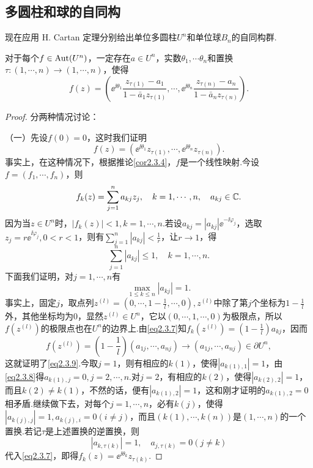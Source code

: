 \subsection{多圆柱和球的自同构}
现在应用 H. Cartan 定理分别给出单位多圆柱$U^n$和单位球$B_n$的自同构群.
\begin{theorem}\label{thm2.3.7}
	对于每个$f\in\operatorname{Aut}(U^n)$，一定存在$a\in U^n$，实数$\theta_1,\cdots\theta_n$和置换$\tau\colon(1,\cdots,n)\to(1,\cdots,n)$，使得
	\[f(z)=\left(\ee^{\ii\theta_1}\frac{z_{\tau(1)}-a_1}{1-\bar{a}_1 z_{\tau(1)}},\cdots,\ee^{\ii\theta_n}\frac{z_{\tau(n)}-a_n}{1-\bar{a}_n z_{\tau(n)}}\right).\]
\end{theorem}
\begin{proof}
	分两种情况讨论：
	
	（一）\hypertarget{2.3.7}{}\quad 先设$f(0)=0$，这时我们证明
	\[f(z)=(\ee^{\ii\theta_1}z_{\tau(1)},\cdots,\ee^{\ii\theta_n}z_{\tau(n)}).\]
	事实上，在这种情况下，根据推论\ref{cor2.3.4}，$f$是一个线性映射.今设$f=(f_1,\cdots,f_n)$，则
	\begin{equation}\label{eq2.3.7}
		f_k(z)=\sum_{j=1}^n a_{kj}z_j,\quad k=1,\cdots,n,\quad a_{kj}\in\mathbb C.
	\end{equation}
因为当$z\in U^n$时，$|f_k(z)|<1,k=1,\cdots,n$.若设$a_{kj}=|a_{kj}|\ee^{-\ii\varphi_j}$，选取$z_j=r\ee^{\ii\varphi_j},0<r<1$，则有$\sum\limits_{j=1}^n |a_{kj}|<\frac1r$，让$r\to 1$，得
\begin{equation}\label{eq2.3.8}
	\sum_{j=1}^{n}|a_{kj}|\le1,\quad k=1,\cdots,n.
\end{equation}
下面我们证明，对$j=1,\cdots,n$有
\begin{equation}\label{eq2.3.9}
	\max_{1\le k\le n}|a_{kj}|=1.
\end{equation}
事实上，固定$j$，取点列$z^{(l)}=\left(0,\cdots,1-\frac1l,\cdots,0\right),z^{(l)}$中除了第$j$个坐标为$1-\frac1l$外，其他坐标均为$0$，显然$z^{(l)}\in U^n$，它以$(0,\cdots,1,\cdots,0)$为极限点，所以$f(z^{(l)})$的极限点也在$U^n$的边界上.由\eqref{eq2.3.7}知$f_k(z^{(l)})=\left(1-\frac1l\right)a_{kj}$，因而
\[f(z^{(l)})=\left(1-\frac1l\right)(a_{1j},\cdots,a_{nj})\to(a_{1j},\cdots,a_{nj})\in\partial U^n,\]
这就证明了\eqref{eq2.3.9}.今取$j=1$，则有相应的$k(1)$，使得$|a_{k(1),1}|=1$，由\eqref{eq2.3.8}得$a_{k(1),j}=0,j=2,\cdots,n$.对$j=2$，有相应的$k(2)$，使得$|a_{k(2),2}|=1$，而且$k(2)\neq k(1)$，不然的话，便有$|a_{k(1),2}|=1$，这和刚才证明的$a_{k(1),2}=0$相矛盾.继续做下去，对每个$j=1,\cdots,n$，必有$k(j)$，使得$|a_{k(j),j}|=1,a_{k(j),i}=0(i\neq j)$，而且$(k(1),\cdots,k(n))$是$(1,\cdots,n)$的一个置换.若记$\tau$是上述置换的逆置换，则
\[|a_{k,\tau(k)}|=1,\quad a_{j,\tau(k)}=0(j\neq k)\]
代入\eqref{eq2.3.7}，即得$f_k(z)=\ee^{\ii\theta_k}z_{\tau(k)}$.


\end{proof}
